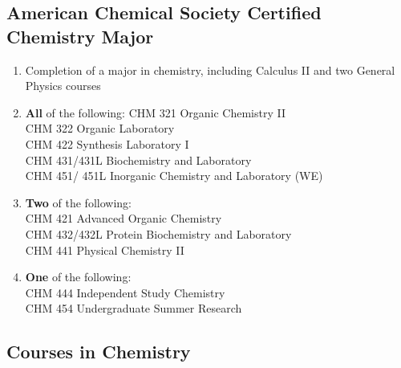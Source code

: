 \documentclass[
  letterpaper,
]{scrbook}
\providecommand{\tightlist}{%
  \setlength{\itemsep}{0pt}\setlength{\parskip}{0pt}}
\begin{document}
\subsection{American Chemical Society Certified Chemistry
Major}\label{american-chemical-society-certified-chemistry-major}

\begin{enumerate}
\def\labelenumi{\arabic{enumi}.}
\tightlist
\item
  Completion of a major in chemistry, including Calculus II and two
  General Physics courses\\
\item
  \textbf{All} of the following: CHM 321 Organic Chemistry II\\
  CHM 322 Organic Laboratory\\
  CHM 422 Synthesis Laboratory I\\
  CHM 431/431L Biochemistry and Laboratory\\
  CHM 451/ 451L Inorganic Chemistry and Laboratory (WE)\\
\item
  \textbf{Two} of the following:\\
  CHM 421 Advanced Organic Chemistry\\
  CHM 432/432L Protein Biochemistry and Laboratory\\
  CHM 441 Physical Chemistry II\\
\item
  \textbf{One} of the following:\\
  CHM 444 Independent Study Chemistry\\
  CHM 454 Undergraduate Summer Research
\end{enumerate}

\subsection{Courses in Chemistry}\label{courses-in-chemistry}
\end{document}

